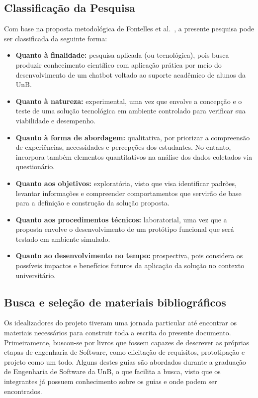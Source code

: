 \subsection{Classificação da Pesquisa}

Com base na proposta metodológica de Fontelles et al.~\cite{fontelles2009}, a presente pesquisa pode ser classificada da seguinte forma:

\begin{itemize}
    \item \textbf{Quanto à finalidade:} pesquisa aplicada (ou tecnológica), pois busca produzir conhecimento científico com aplicação prática por meio do desenvolvimento de um chatbot voltado ao suporte acadêmico de alunos da UnB.
    
    \item \textbf{Quanto à natureza:} experimental, uma vez que envolve a concepção e o teste de uma solução tecnológica em ambiente controlado para verificar sua viabilidade e desempenho.
    
    \item \textbf{Quanto à forma de abordagem:} qualitativa, por priorizar a compreensão de experiências, necessidades e percepções dos estudantes. No entanto, incorpora também elementos quantitativos na análise dos dados coletados via questionário.
    
    \item \textbf{Quanto aos objetivos:} exploratória, visto que visa identificar padrões, levantar informações e compreender comportamentos que servirão de base para a definição e construção da solução proposta.
    
    \item \textbf{Quanto aos procedimentos técnicos:} laboratorial, uma vez que a proposta envolve o desenvolvimento de um protótipo funcional que será testado em ambiente simulado.
    
    \item \textbf{Quanto ao desenvolvimento no tempo:} prospectiva, pois considera os possíveis impactos e benefícios futuros da aplicação da solução no contexto universitário.
\end{itemize}

\subsection{Busca e seleção de materiais bibliográficos}

Os idealizadores do projeto tiveram uma jornada particular até encontrar os materiais necessários para construir toda a escrita do presente documento. Primeiramente, buscou-se por livros que fossem capazes de descrever as próprias etapas de engenharia de Software, como elicitação de requisitos, prototipação e projeto como um todo. Alguns destes guias são abordados durante a graduação de Engenharia de Software da UnB, o que facilita a busca, visto que os integrantes já possuem conhecimento sobre os guias e onde podem ser encontrados.

